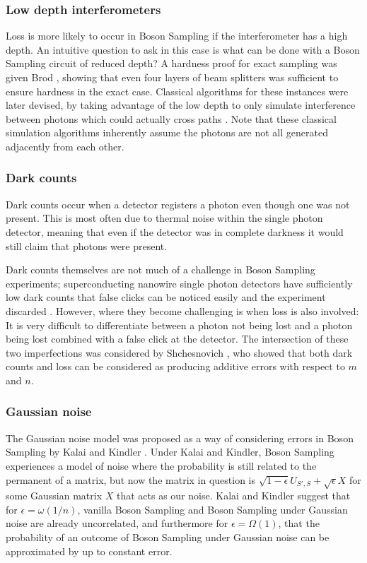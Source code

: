 \subsubsection{Low depth interferometers}

Loss is more likely to occur in Boson Sampling if the interferometer has a high depth. An intuitive question to ask in this case is what can be done with a Boson Sampling circuit of reduced depth? A hardness proof for exact sampling was given Brod \cite{brod2015}, showing that even four layers of beam splitters was sufficient to ensure hardness in the exact case. Classical algorithms for these instances were later devised, by taking advantage of the low depth to only simulate interference between photons which could actually cross paths \cite{deshpande2018, maskara2019}. Note that these classical simulation algorithms inherently assume the photons are not all generated adjacently from each other.

\subsubsection{Dark counts}

Dark counts occur when a detector registers a photon even though one was not present. This is most often due to thermal noise within the single photon detector, meaning that even if the detector was in complete darkness it would still claim that photons were present.

Dark counts themselves are not much of a challenge in Boson Sampling experiments; superconducting nanowire single photon detectors have sufficiently low dark counts that false clicks can be noticed easily and the experiment discarded \cite{kitaygorsky2005}. However, where they become challenging is when loss is also involved: It is very difficult to differentiate between a photon not being lost and a photon being lost combined with a false click at the detector. The intersection of these two imperfections was considered by Shchesnovich \cite{shchesnovich2014darkcounts}, who showed that both dark counts and loss can be considered as producing additive errors with respect to $m$ and $n$.

\subsubsection{Gaussian noise}

The Gaussian noise model was proposed as a way of considering errors in Boson Sampling by Kalai and Kindler \cite{kalai2014}. Under Kalai and Kindler, Boson Sampling experiences a model of noise where the probability is still related to the permanent of a matrix, but now  the matrix in question is $\sqrt{1-\epsilon}U_{S',S}+\sqrt{\epsilon}X$ for some Gaussian matrix $X$ that acts as our noise. Kalai and Kindler suggest that for $\epsilon=\omega(1/n)$, vanilla Boson Sampling and Boson Sampling under Gaussian noise are already uncorrelated, and furthermore for $\epsilon = \Omega(1)$, that the probability of an outcome of Boson Sampling under Gaussian noise can be approximated by up to constant error.

